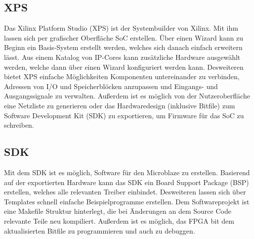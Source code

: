 \subsection{XPS}
Das Xilinx Platform Studio (XPS) ist der Systembuilder von Xilinx. Mit ihm lassen sich per grafischer Oberfläche SoC erstellen. Über einen Wizard kann zu Beginn ein Basis-System erstellt werden, welches sich danach einfach erweitern lässt. Aus einem Katalog von IP-Cores kann zusätzliche Hardware ausgewählt werden, welche dann über einen Wizard konfiguriert werden kann. Desweiteren bietet XPS einfache Möglichkeiten Komponenten untereinander zu verbinden, Adressen von I/O und Speicherblöcken anzupassen und Eingangs- und Ausgangssignale zu verwalten. Außerdem ist es möglich von der Nutzeroberfläche eine Netzliste zu generieren oder das Hardwaredesign (inklusive Bitfile) zum Software Development Kit (SDK) zu exportieren, um Firmware für das SoC zu schreiben. \cite{MBTOOLS}
\subsection{SDK}
Mit dem SDK ist es möglich, Software für den Microblaze zu erstellen. Basierend auf der exportierten Hardware kann das SDK ein Board Support Package (BSP) erstellen, welches alle relevanten Treiber einbindet. Desweiteren lassen sich über Templates schnell einfache Beispielprogramme erstellen. Dem Softwareprojekt ist eine Makefile Struktur hinterlegt, die bei Änderungen an dem Source Code relevante Teile neu kompiliert. Außerdem ist es möglich, das FPGA bit dem aktualisierten Bitfile zu programmieren und auch zu debuggen. \cite{MBTOOLS}


